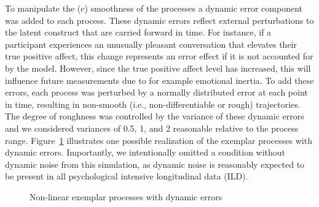 \documentclass[man, floatsintext]{apa7}
\begin{document}
To manipulate the (c) smoothness of the processes a dynamic error component was
added to each process. These dynamic errors reflect external perturbations to
the latent construct that are carried forward in time. For instance, if a
participant experiences an unusually pleasant conversation that elevates their
true positive affect, this change represents an error effect if it is not
accounted for by the model. However, since the true positive affect level has
increased, this will influence future measurements due to for example emotional
inertia. To add these errors, each process was perturbed by a normally
distributed error at each point in time, resulting in non-smooth (i.e.,
non-differentiable or rough) trajectories. The degree of roughness was
controlled by the variance of these dynamic errors and we considered variances
of 0.5, 1, and 2 reasonable relative to the process range.
Figure~\ref{fig:exemplar_pn} illustrates one possible realization of the
exemplar processes with dynamic errors. Importantly, we intentionally omitted a
condition without dynamic noise from this simulation, as dynamic noise is
reasonably expected to be present in all psychological intensive longitudinal
data (ILD).

\begin{figure}[!t]
  \caption{Non-linear exemplar processes with dynamic errors}
  \label{fig:exemplar_pn}
\end{figure}
\end{document}
